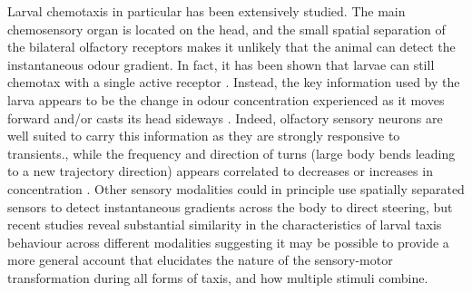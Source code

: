\documentclass[10pt,a4paper]{article}
\begin{document}
Larval chemotaxis in particular has been extensively studied. The main chemosensory organ is located on the head, and the small spatial separation of the bilateral olfactory receptors makes it unlikely that the animal can detect the instantaneous odour gradient. In fact, it has been shown that larvae can still chemotax with a single active receptor  \citep{fishilevich2005chemotaxis,gomez2010mechanisms,louis2008bilateral}. Instead, the key information used by the larva  appears to be the change in odour concentration experienced as it moves forward and/or casts its head sideways \citep{gomez2010mechanisms}. 
Indeed, olfactory sensory neurons are well suited to carry this information as they are strongly responsive to transients\citep{de2013common,nagel2011biophysical,kim2011system,schulze2015dynamical}., while the frequency and direction of turns (large body bends leading to a new trajectory direction) appears correlated to  decreases or increases in concentration  \citep{hernandez2015reverse}.  Other sensory modalities could in principle use spatially separated sensors to detect instantaneous gradients across the body to direct steering, but%
recent studies reveal substantial similarity in the characteristics of larval taxis behaviour across different modalities \citep{gepner2015computations, bellmann2010optogenetically, lahiri2011two} suggesting it may be possible to provide a more general account that elucidates the nature of the sensory-motor transformation during all forms of taxis, and how multiple stimuli combine. 
\end{document}
